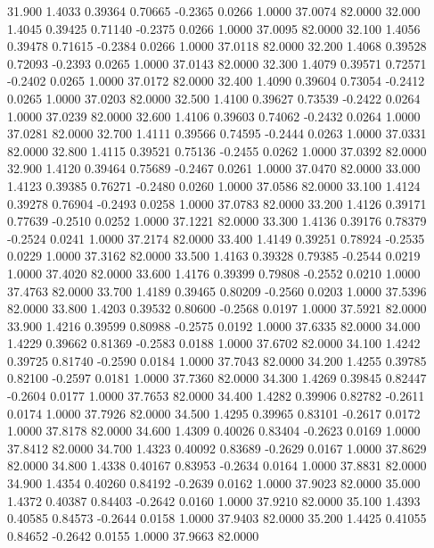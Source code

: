   31.900   1.4033   0.39364   0.70665  -0.2365   0.0266   1.0000  37.0074  82.0000
  32.000   1.4045   0.39425   0.71140  -0.2375   0.0266   1.0000  37.0095  82.0000
  32.100   1.4056   0.39478   0.71615  -0.2384   0.0266   1.0000  37.0118  82.0000
  32.200   1.4068   0.39528   0.72093  -0.2393   0.0265   1.0000  37.0143  82.0000
  32.300   1.4079   0.39571   0.72571  -0.2402   0.0265   1.0000  37.0172  82.0000
  32.400   1.4090   0.39604   0.73054  -0.2412   0.0265   1.0000  37.0203  82.0000
  32.500   1.4100   0.39627   0.73539  -0.2422   0.0264   1.0000  37.0239  82.0000
  32.600   1.4106   0.39603   0.74062  -0.2432   0.0264   1.0000  37.0281  82.0000
  32.700   1.4111   0.39566   0.74595  -0.2444   0.0263   1.0000  37.0331  82.0000
  32.800   1.4115   0.39521   0.75136  -0.2455   0.0262   1.0000  37.0392  82.0000
  32.900   1.4120   0.39464   0.75689  -0.2467   0.0261   1.0000  37.0470  82.0000
  33.000   1.4123   0.39385   0.76271  -0.2480   0.0260   1.0000  37.0586  82.0000
  33.100   1.4124   0.39278   0.76904  -0.2493   0.0258   1.0000  37.0783  82.0000
  33.200   1.4126   0.39171   0.77639  -0.2510   0.0252   1.0000  37.1221  82.0000
  33.300   1.4136   0.39176   0.78379  -0.2524   0.0241   1.0000  37.2174  82.0000
  33.400   1.4149   0.39251   0.78924  -0.2535   0.0229   1.0000  37.3162  82.0000
  33.500   1.4163   0.39328   0.79385  -0.2544   0.0219   1.0000  37.4020  82.0000
  33.600   1.4176   0.39399   0.79808  -0.2552   0.0210   1.0000  37.4763  82.0000
  33.700   1.4189   0.39465   0.80209  -0.2560   0.0203   1.0000  37.5396  82.0000
  33.800   1.4203   0.39532   0.80600  -0.2568   0.0197   1.0000  37.5921  82.0000
  33.900   1.4216   0.39599   0.80988  -0.2575   0.0192   1.0000  37.6335  82.0000
  34.000   1.4229   0.39662   0.81369  -0.2583   0.0188   1.0000  37.6702  82.0000
  34.100   1.4242   0.39725   0.81740  -0.2590   0.0184   1.0000  37.7043  82.0000
  34.200   1.4255   0.39785   0.82100  -0.2597   0.0181   1.0000  37.7360  82.0000
  34.300   1.4269   0.39845   0.82447  -0.2604   0.0177   1.0000  37.7653  82.0000
  34.400   1.4282   0.39906   0.82782  -0.2611   0.0174   1.0000  37.7926  82.0000
  34.500   1.4295   0.39965   0.83101  -0.2617   0.0172   1.0000  37.8178  82.0000
  34.600   1.4309   0.40026   0.83404  -0.2623   0.0169   1.0000  37.8412  82.0000
  34.700   1.4323   0.40092   0.83689  -0.2629   0.0167   1.0000  37.8629  82.0000
  34.800   1.4338   0.40167   0.83953  -0.2634   0.0164   1.0000  37.8831  82.0000
  34.900   1.4354   0.40260   0.84192  -0.2639   0.0162   1.0000  37.9023  82.0000
  35.000   1.4372   0.40387   0.84403  -0.2642   0.0160   1.0000  37.9210  82.0000
  35.100   1.4393   0.40585   0.84573  -0.2644   0.0158   1.0000  37.9403  82.0000
  35.200   1.4425   0.41055   0.84652  -0.2642   0.0155   1.0000  37.9663  82.0000
